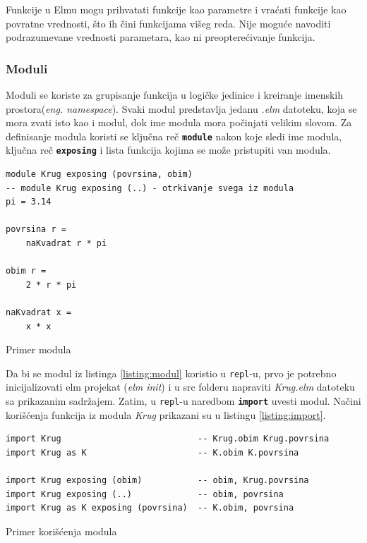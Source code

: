 \documentclass[12pt,oneside]{memoir}
\begin{document}
Funkcije u Elmu mogu prihvatati funkcije kao parametre i vraćati funkcije kao 
povratne vrednosti, što ih čini funkcijama višeg reda. Nije moguće navoditi
podrazumevane vrednosti parametara, kao ni preopterećivanje funkcija.

\subsubsection{Moduli}
Moduli se koriste za grupisanje funkcija u logičke jedinice i kreiranje imenskih 
prostora(\emph{eng. namespace}). Svaki modul predstavlja jedanu \emph{.elm} datoteku,
koja se mora zvati isto kao i modul, dok ime modula mora počinjati velikim slovom.
Za definisanje modula koristi se ključna reč \texttt{\textbf{module}} nakon koje sledi
ime modula, ključna reč \texttt{\textbf{exposing}} i lista funkcija kojima se može 
pristupiti van modula.
\begin{listing}[h]
\begin{verbatim}
module Krug exposing (povrsina, obim) 
-- module Krug exposing (..) - otrkivanje svega iz modula 
pi = 3.14

povrsina r =
    naKvadrat r * pi

obim r =
    2 * r * pi

naKvadrat x =
    x * x
\end{verbatim}
\caption{Primer modula}
\label{listing:modul}
\end{listing}

Da bi se modul iz listinga \ref{listing:modul} koristio u \texttt{repl}-u, prvo je 
potrebno inicijalizovati elm projekat (\emph{elm init}) i u src folderu napraviti 
\emph{Krug.elm} datoteku sa prikazanim sadržajem. Zatim, u \texttt{repl}-u naredbom 
\texttt{\textbf{import}} uvesti modul. Načini korišćenja funkcija iz modula
\emph{Krug} prikazani su u listingu \ref{listing:import}.
\begin{listing}[h]
\begin{verbatim}
import Krug                           -- Krug.obim Krug.povrsina
import Krug as K                      -- K.obim K.povrsina

import Krug exposing (obim)           -- obim, Krug.povrsina
import Krug exposing (..)             -- obim, povrsina
import Krug as K exposing (povrsina)  -- K.obim, povrsina
\end{verbatim}
\caption{Primer korišćenja modula}
\label{listing:import}
\end{listing}
\end{document}
